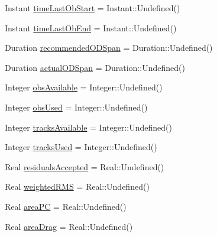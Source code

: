 \begin{DoxyCompactItemize}
\item 
Instant \hyperlink{structostk_1_1astro_1_1conjunction_1_1messages_1_1ccsds_1_1_c_d_m_1_1_data_ad554f0dd23c5ec30e6de4a5f2d7a2ece}{time\+Last\+Ob\+Start} = Instant\+::\+Undefined()
\item 
Instant \hyperlink{structostk_1_1astro_1_1conjunction_1_1messages_1_1ccsds_1_1_c_d_m_1_1_data_abfcfb812c643a21e44307f68cdf62225}{time\+Last\+Ob\+End} = Instant\+::\+Undefined()
\item 
Duration \hyperlink{structostk_1_1astro_1_1conjunction_1_1messages_1_1ccsds_1_1_c_d_m_1_1_data_a60bd4f519dad47a722abe9390348495f}{recommended\+O\+D\+Span} = Duration\+::\+Undefined()
\item 
Duration \hyperlink{structostk_1_1astro_1_1conjunction_1_1messages_1_1ccsds_1_1_c_d_m_1_1_data_a4515fd382236aebbaf829770dca9820e}{actual\+O\+D\+Span} = Duration\+::\+Undefined()
\item 
Integer \hyperlink{structostk_1_1astro_1_1conjunction_1_1messages_1_1ccsds_1_1_c_d_m_1_1_data_a71664e7f7550dc091d65527a16c343fb}{obs\+Available} = Integer\+::\+Undefined()
\item 
Integer \hyperlink{structostk_1_1astro_1_1conjunction_1_1messages_1_1ccsds_1_1_c_d_m_1_1_data_a1500fda81608b90de6e2f8ee2f8de237}{obs\+Used} = Integer\+::\+Undefined()
\item 
Integer \hyperlink{structostk_1_1astro_1_1conjunction_1_1messages_1_1ccsds_1_1_c_d_m_1_1_data_a4dc2ead201237e6599d4e6d3ef4b91ec}{tracks\+Available} = Integer\+::\+Undefined()
\item 
Integer \hyperlink{structostk_1_1astro_1_1conjunction_1_1messages_1_1ccsds_1_1_c_d_m_1_1_data_aee9cd2e0a4277eb259710128397d0c14}{tracks\+Used} = Integer\+::\+Undefined()
\item 
Real \hyperlink{structostk_1_1astro_1_1conjunction_1_1messages_1_1ccsds_1_1_c_d_m_1_1_data_a762ebadedd5504222e2eac267a89bf10}{residuals\+Accepted} = Real\+::\+Undefined()
\item 
Real \hyperlink{structostk_1_1astro_1_1conjunction_1_1messages_1_1ccsds_1_1_c_d_m_1_1_data_ace9f33401b6e7a3efe39207ae1c37467}{weighted\+R\+MS} = Real\+::\+Undefined()
\item 
Real \hyperlink{structostk_1_1astro_1_1conjunction_1_1messages_1_1ccsds_1_1_c_d_m_1_1_data_a00e55a441c2166dd9a12d1b7c2a3226d}{area\+PC} = Real\+::\+Undefined()
\item 
Real \hyperlink{structostk_1_1astro_1_1conjunction_1_1messages_1_1ccsds_1_1_c_d_m_1_1_data_a177b42a7dcc3c591fac300b882ffd805}{area\+Drag} = Real\+::\+Undefined()

\end{DoxyCompactItemize}
